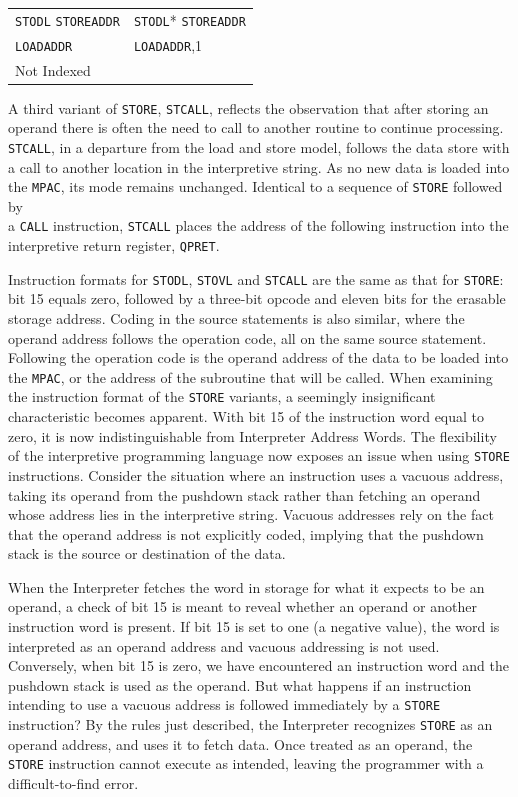 \documentclass[refcap, oxford]{ahsan}
\begin{document}
\begin{center}
\begin{tabular}{ll}
\hline
\texttt{STODL} \texttt{STOREADDR} & \texttt{STODL}* \texttt{STOREADDR} \\
\texttt{LOADADDR} & \texttt{LOADADDR},1 \\
Not Indexed &  \\
\hline
\end{tabular}
\end{center}

A third variant of \texttt{STORE}, \texttt{STCALL}, reflects the observation that after storing an operand there is often the need to call to another routine to continue processing. \texttt{STCALL}, in a departure from the load and store model, follows the data store with a call to another location in the interpretive string. As no new data is loaded into the \texttt{MPAC}, its mode remains unchanged. Identical to a sequence of \texttt{STORE} followed by\\
a \texttt{CALL} instruction, \texttt{STCALL} places the address of the following instruction into the interpretive return register, \texttt{QPRET}.

Instruction formats for \texttt{STODL}, \texttt{STOVL} and \texttt{STCALL} are the same as that for \texttt{STORE}: bit 15 equals zero, followed by a three-bit opcode and eleven bits for the erasable storage address. Coding in the source statements is also similar, where the operand address follows the operation code, all on the same source statement. Following the operation code is the operand address of the data to be loaded into the \texttt{MPAC}, or the address of the subroutine that will be called. When examining the instruction format of the \texttt{STORE} variants, a seemingly insignificant characteristic becomes apparent. With bit 15 of the instruction word equal to zero, it is now indistinguishable from Interpreter Address Words. The flexibility of the interpretive programming language now exposes an issue when using \texttt{STORE} instructions. Consider the situation where an instruction uses a vacuous address, taking its operand from the pushdown stack rather than fetching an operand whose address lies in the interpretive string. Vacuous addresses rely on the fact that the operand address is not explicitly coded, implying that the pushdown stack is the source or destination of the data.

When the Interpreter fetches the word in storage for what it expects to be an operand, a check of bit 15 is meant to reveal whether an operand or another instruction word is present. If bit 15 is set to one (a negative value), the word is interpreted as an operand address and vacuous addressing is not used. Conversely, when bit 15 is zero, we have encountered an instruction word and the pushdown stack is used as the operand. But what happens if an instruction intending to use a vacuous address is followed immediately by a \texttt{STORE} instruction? By the rules just described, the Interpreter recognizes \texttt{STORE} as an operand address, and uses it to fetch data. Once treated as an operand, the \texttt{STORE} instruction cannot execute as intended, leaving the programmer with a difficult-to-find error.
\end{document}

